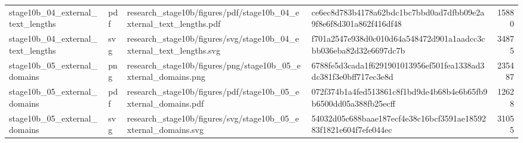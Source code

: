 \begin{tabular}{llllr}
stage10b\_04\_external\_text\_lengths & pdf & research\_stage10b/figures/pdf/stage10b\_04\_external\_text\_lengths.pdf & ce6ec8d783b4178a62bdc1bc7bbd0ad7dfbb09e2a9f8e6f8d301a862f416df48 & 15880 \\
stage10b\_04\_external\_text\_lengths & svg & research\_stage10b/figures/svg/stage10b\_04\_external\_text\_lengths.svg & f701a2547e938d0c010d64a548472d901a1aadcc3cbb036eba82d32e6697dc7b & 34875 \\
stage10b\_05\_external\_domains & png & research\_stage10b/figures/png/stage10b\_05\_external\_domains.png & 6788fe5d3cada1f6291901013956ef501fea1338ad3dc381f3e0bff717ec3e8d & 235487 \\
stage10b\_05\_external\_domains & pdf & research\_stage10b/figures/pdf/stage10b\_05\_external\_domains.pdf & 072f374b1a4fed513861c8f1bd9de4b68b4e6b65fb9b6500dd05a388fb25ecff & 12628 \\
stage10b\_05\_external\_domains & svg & research\_stage10b/figures/svg/stage10b\_05\_external\_domains.svg & 54032d05c688baae187ecf4e38c16bcf3591ae1859283f1821e604f7efe044ec & 31055 \\
\bottomrule
\end{tabular}
